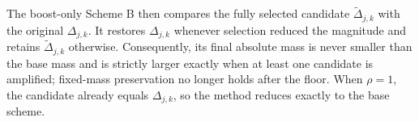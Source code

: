 The boost-only Scheme B then compares the fully selected candidate
$\widetilde{\Delta}_{j,k}$ with the original $\Delta_{j,k}$.  It restores
$\Delta_{j,k}$ whenever selection reduced the magnitude and retains
$\widetilde{\Delta}_{j,k}$ otherwise.  Consequently, its final absolute mass
is never smaller than the base mass and is strictly larger exactly when at
least one candidate is amplified; fixed-mass preservation no longer holds
after the floor.  When $\rho=1$, the candidate already equals
$\Delta_{j,k}$, so the method reduces exactly to the base scheme.










